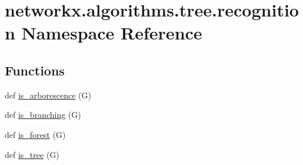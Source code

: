 \hypertarget{namespacenetworkx_1_1algorithms_1_1tree_1_1recognition}{}\section{networkx.\+algorithms.\+tree.\+recognition Namespace Reference}
\label{namespacenetworkx_1_1algorithms_1_1tree_1_1recognition}
\subsection*{Functions}
\begin{DoxyCompactItemize}
\item 
def \hyperlink{namespacenetworkx_1_1algorithms_1_1tree_1_1recognition_a39e9081aa63bc4c106fd8dc0cc4d5e51}{is\+\_\+arborescence} (G)
\item 
def \hyperlink{namespacenetworkx_1_1algorithms_1_1tree_1_1recognition_ae93ee5537aae537d550b1fadc2eaf992}{is\+\_\+branching} (G)
\item 
def \hyperlink{namespacenetworkx_1_1algorithms_1_1tree_1_1recognition_afa313295940a819b7b46b485062d9eab}{is\+\_\+forest} (G)
\item 
def \hyperlink{namespacenetworkx_1_1algorithms_1_1tree_1_1recognition_a5a576f572714440375b8ff046d00d024}{is\+\_\+tree} (G)
\end{DoxyCompactItemize}


